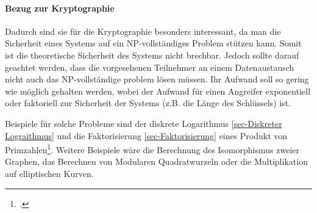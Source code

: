     \paragraph{Bezug zur Kryptographie} Dadurch sind sie für die Kryptographie besonders interessant, da man die Sicherheit eines Systems auf ein NP-vollständiges Problem stützen kann. Somit ist die theoretische Sicherheit des Systems nicht brechbar. Jedoch sollte darauf geachtet werden, dass die vorgesehenen Teilnehmer an einem Datenaustausch nicht auch das NP-vollständige problem lösen müssen. Ihr Aufwand soll so gering wie möglich gehalten werden, wobei der Aufwand für einen Angreifer exponentiell oder faktoriell zur Sicherheit der Systems (z.B. die Länge des Schlüssels) ist. 

    Beispiele für solche Probleme sind der diskrete Logarithmus \ref{sec-Diskreter Lograithmus} und die Faktorisierung \ref{sec-Faktorisierung} eines Produkt von Primzahlen\footcite[179]{BSW.2015}. Weitere Beispiele wäre die Berechnung des Isomorphismus zweier Graphen, das Berechnen von Modularen Quadratwurzeln oder die Multiplikation auf elliptischen Kurven.

